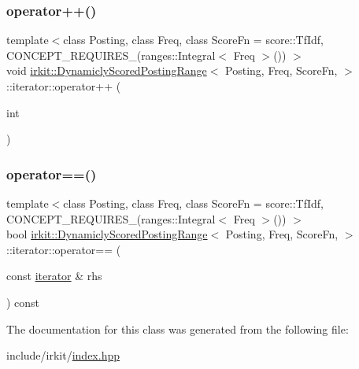 \mbox{\label{classirkit_1_1DynamiclyScoredPostingRange_1_1iterator_a0e72e53fba01c4ef07f4ee4495fb786b}} 
\subsubsection{\texorpdfstring{operator++()}{operator++()}\hspace{0.1cm}{\footnotesize\ttfamily [2/2]}}
{\footnotesize\ttfamily template$<$class Posting, class Freq, class Score\+Fn = score\+::\+Tf\+Idf, C\+O\+N\+C\+E\+P\+T\+\_\+\+R\+E\+Q\+U\+I\+R\+E\+S\+\_\+(ranges\+::\+Integral$<$ Freq $>$()) $>$ \\
void \hyperlink{classirkit_1_1DynamiclyScoredPostingRange}{irkit\+::\+Dynamicly\+Scored\+Posting\+Range}$<$ Posting, Freq, Score\+Fn, $>$\+::iterator\+::operator++ (\begin{DoxyParamCaption}\item[{int}]{ }\end{DoxyParamCaption})\hspace{0.3cm}{\ttfamily [inline]}}

\mbox{\label{classirkit_1_1DynamiclyScoredPostingRange_1_1iterator_ac097b4d56a87359fe0f726042d639cc9}} 
\subsubsection{\texorpdfstring{operator==()}{operator==()}}
{\footnotesize\ttfamily template$<$class Posting, class Freq, class Score\+Fn = score\+::\+Tf\+Idf, C\+O\+N\+C\+E\+P\+T\+\_\+\+R\+E\+Q\+U\+I\+R\+E\+S\+\_\+(ranges\+::\+Integral$<$ Freq $>$()) $>$ \\
bool \hyperlink{classirkit_1_1DynamiclyScoredPostingRange}{irkit\+::\+Dynamicly\+Scored\+Posting\+Range}$<$ Posting, Freq, Score\+Fn, $>$\+::iterator\+::operator== (\begin{DoxyParamCaption}\item[{const \hyperlink{classirkit_1_1DynamiclyScoredPostingRange_1_1iterator}{iterator} \&}]{rhs }\end{DoxyParamCaption}) const\hspace{0.3cm}{\ttfamily [inline]}}



The documentation for this class was generated from the following file\+:\begin{DoxyCompactItemize}
\item 
include/irkit/\hyperlink{irkit_2index_8hpp}{index.\+hpp}\end{DoxyCompactItemize}
